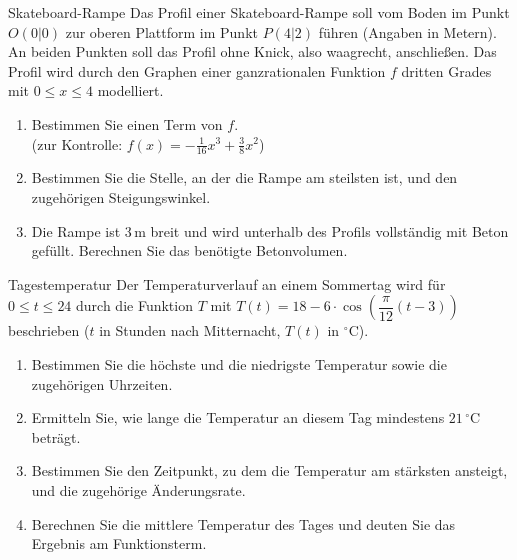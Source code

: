 \begin{uebung}{Skateboard-Rampe}
Das Profil einer Skateboard-Rampe soll vom Boden im Punkt $O(0|0)$ zur oberen Plattform im Punkt $P(4|2)$ führen (Angaben in Metern). An beiden Punkten soll das Profil ohne Knick, also waagrecht, anschließen. Das Profil wird durch den Graphen einer ganzrationalen Funktion $f$ dritten Grades mit $0\leq x\leq 4$ modelliert.
\begin{enumerate}[label=\alph*)]
  \item Bestimmen Sie einen Term von $f$.\\
  {\small (zur Kontrolle: $f(x) = -\frac{1}{16}x^3+\frac{3}{8}x^2$)}
  \item Bestimmen Sie die Stelle, an der die Rampe am steilsten ist, und den zugehörigen Steigungswinkel.
  \item Die Rampe ist $3\,\text{m}$ breit und wird unterhalb des Profils vollständig mit Beton gefüllt. Berechnen Sie das benötigte Betonvolumen.
\end{enumerate}
\end{uebung}

\begin{uebung}{Tagestemperatur}
Der Temperaturverlauf an einem Sommertag wird für $0\leq t\leq 24$ durch die Funktion $T$ mit $T(t) = 18-6\cdot\cos{\left(\dfrac{\pi}{12}(t-3)\right)}$ beschrieben ($t$ in Stunden nach Mitternacht, $T(t)$ in $^{\circ}$C).
\begin{enumerate}[label=\alph*)]
  \item Bestimmen Sie die höchste und die niedrigste Temperatur sowie die zugehörigen Uhrzeiten.
  \item Ermitteln Sie, wie lange die Temperatur an diesem Tag mindestens $21\,^{\circ}$C beträgt.
  \item Bestimmen Sie den Zeitpunkt, zu dem die Temperatur am stärksten ansteigt, und die zugehörige Änderungsrate.
  \item Berechnen Sie die mittlere Temperatur des Tages und deuten Sie das Ergebnis am Funktionsterm.
\end{enumerate}
\end{uebung}

